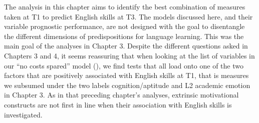 \documentclass[output=paper]{langsci/langscibook}
\begin{document}
The analysis in this chapter aims to identify the best combination of measures taken at T1 to predict English skills at T3. The models discussed here, and their variable prognostic performance, are not designed with the goal to disentangle the different dimensions of predispositions for language learning. This was the main goal of the analyses in Chapter 3. Despite the different questions asked in Chapters 3 and 4, it seems reassuring that when looking at the list of variables in our ``no costs spared'' model (), we find tests that all load onto one of the two factors that are positively associated with English skills at T1, that is measures we subsumed under the two labels cognition/aptitude and L2 academic emotion in Chapter 3. As in that preceding chapter’s analyses, extrinsic motivational constructs are not first in line when their association with English skills is investigated. 

{\sloppy\printbibliography[heading=subbibliography,notkeyword=this]}
\end{document}

